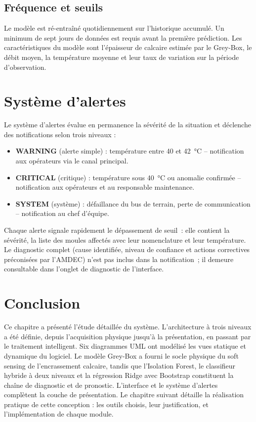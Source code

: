 \subsection{Fréquence et seuils}

Le modèle est ré-entraîné quotidiennement sur l'historique accumulé. Un minimum de sept jours de données est requis avant la première prédiction. Les caractéristiques du modèle sont l'épaisseur de calcaire estimée par le Grey-Box, le débit moyen, la température moyenne et leur taux de variation sur la période d'observation.

\section{Système d'alertes}

Le système d'alertes évalue en permanence la sévérité de la situation et déclenche des notifications selon trois niveaux :

\begin{itemize}
  \item \textbf{WARNING} (alerte simple) : température entre 40 et 42~\si{\celsius} -- notification aux opérateurs via le canal principal.
  \item \textbf{CRITICAL} (critique) : température sous 40~\si{\celsius} ou anomalie confirmée -- notification aux opérateurs et au responsable maintenance.
  \item \textbf{SYSTEM} (système) : défaillance du bus de terrain, perte de communication -- notification au chef d'équipe.
\end{itemize}

Chaque alerte signale rapidement le dépassement de seuil~: elle contient la sévérité, la liste des moules affectés avec leur nomenclature et leur température. Le diagnostic complet (cause identifiée, niveau de confiance et actions correctives préconisées par l'AMDEC) n'est pas inclus dans la notification~; il demeure consultable dans l'onglet de diagnostic de l'interface.

\section*{Conclusion}

Ce chapitre a présenté l'étude détaillée du système. L'architecture à trois niveaux a été définie, depuis l'acquisition physique jusqu'à la présentation, en passant par le traitement intelligent. Six diagrammes UML ont modélisé les vues statique et dynamique du logiciel. Le modèle Grey-Box a fourni le socle physique du soft sensing de l'encrassement calcaire, tandis que l'Isolation Forest, le classifieur hybride à deux niveaux et la régression Ridge avec Bootstrap constituent la chaîne de diagnostic et de pronostic. L'interface et le système d'alertes complètent la couche de présentation. Le chapitre suivant détaille la réalisation pratique de cette conception : les outils choisis, leur justification, et l'implémentation de chaque module.